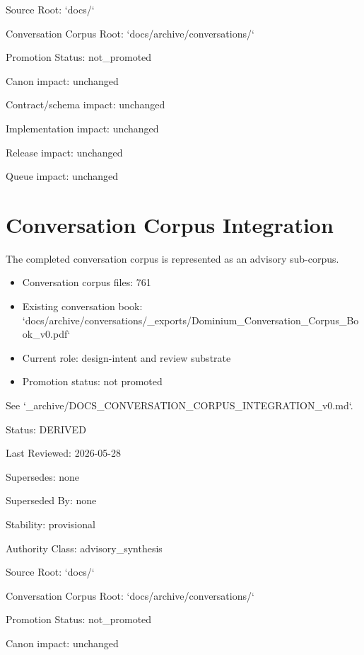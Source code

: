 \documentclass[11pt,a4paper]{report}
\begin{document}
Source Root: `docs/\allowbreak{}`

Conversation Corpus Root: `docs/\allowbreak{}archive/\allowbreak{}conversations/\allowbreak{}`

Promotion Status: not\_promoted

Canon impact: unchanged

Contract/\allowbreak{}schema impact: unchanged

Implementation impact: unchanged

Release impact: unchanged

Queue impact: unchanged


\chapter{Conversation Corpus Integration}

The completed conversation corpus is represented as an advisory sub-\allowbreak{}corpus.\allowbreak{}


\begin{itemize}
\item Conversation corpus files: 761
\item Existing conversation book: `docs/\allowbreak{}archive/\allowbreak{}conversations/\allowbreak{}\_exports/\allowbreak{}Dominium\_Conversation\_Corpus\_Book\_v0.\allowbreak{}pdf`
\item Current role: design-\allowbreak{}intent and review substrate
\item Promotion status: not promoted
\end{itemize}

See `\_archive/\allowbreak{}DOCS\_CONVERSATION\_CORPUS\_INTEGRATION\_v0.\allowbreak{}md`.\allowbreak{}



Status: DERIVED

Last Reviewed: 2026-\allowbreak{}05-\allowbreak{}28

Supersedes: none

Superseded By: none

Stability: provisional

Authority Class: advisory\_synthesis

Source Root: `docs/\allowbreak{}`

Conversation Corpus Root: `docs/\allowbreak{}archive/\allowbreak{}conversations/\allowbreak{}`

Promotion Status: not\_promoted

Canon impact: unchanged
\end{document}
